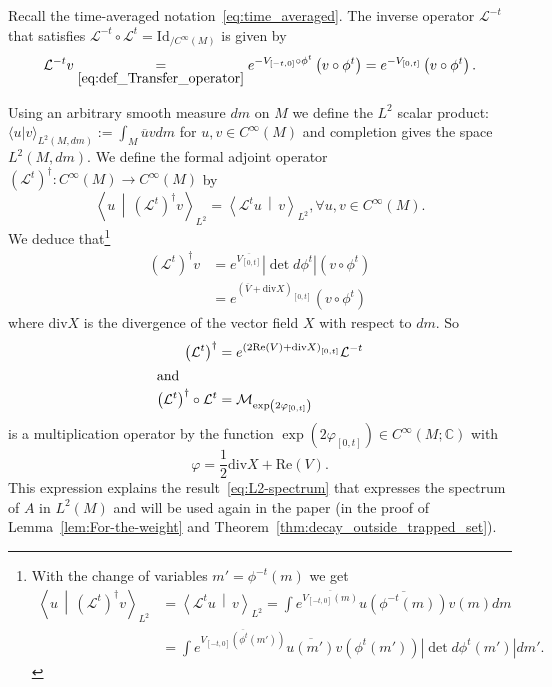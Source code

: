 \documentclass[10pt]{amsart}
\theoremstyle{definition}\newtheorem{defi}[theo]{Definition}\newtheorem{rema}[theo]{Remark}\newtheorem{exam}[theo]{Example}\newtheorem{exem}[theo]{Example}\newtheorem{nota}[theo]{Notation}
\newcommand{\clL}{\mathcal{L}}
\newcommand{\clM}{\mathcal{M}}
\newcommand{\Ree}{\mathrm{Re}}
\newcommand{\divv}{\mathrm{div}}
\newcommand{\Id}{\mathrm{Id}}
\newcommand{\bbC}{\mathbb{C}}
\let\oldforall\forall
\renewcommand*{\forall}{\mathrel{\oldforall}}
\begin{document}
Recall the time-averaged notation~\eqref{eq:time_averaged}. The inverse operator $\clL^{-t}$ that satisfies $\clL^{-t}\circ\clL^{t}=\Id _{/C^{\infty}(M)}$ is given by
\[
\clL^{-t}v\underset{\eqref{eq:def_Transfer_operator}}{=}e^{-V_{\left[-t,0\right]}\circ\phi^{t}}\left(v\circ\phi^{t}\right)=e^{-V_{\left[0,t\right]}}\left(v\circ\phi^{t}\right).
\]

Using an arbitrary smooth measure $dm$ on $M$ we define the $L^{2}$ scalar product: $\langle u|v\rangle_{L^{2}(M,dm)}:=\int_{M}\overline{u}vdm$ for $u,v\in C^{\infty}(M)$ and completion gives the space $L^{2}(M,dm)$. We define the formal adjoint operator $(\clL^{t})^{\dagger}:C^{\infty}(M)\rightarrow C^{\infty}(M)$ by
\[
\left\langle u\,\middle|\,\left(\clL^{t}\right)^{\dagger}v\right\rangle_{L^{2}}=\left\langle\clL^{t}u\,\middle|\,v\right\rangle_{L^{2}},\forall u,v\in C^{\infty}\left(M\right).
\]
We deduce that\footnote{With the change of variables $m'=\phi^{-t}(m)$ we get
\begin{align*}
\left\langle u\,\middle|\,\left(\clL^{t}\right)^{\dagger}v\right\rangle_{L^{2}} & =\left\langle\clL^{t}u\,\middle|\,v\right\rangle_{L^{2}}=\int e^{\overline{V_{\left[-t,0\right]}\left(m\right)}}\overline{u\left(\phi^{-t}\left(m\right)\right)}v\left(m\right)dm\\
& =\int e^{\overline{V_{\left[-t,0\right]}\left(\phi^{t}\left(m'\right)\right)}}\overline{u\left(m'\right)}v\left(\phi^{t}\left(m'\right)\right)\left|\det d\phi^{t}\left(m'\right)\right|dm'.
\end{align*}
}
\begin{align}
\left(\clL^{t}\right)^{\dagger}v & =e^{\overline{V_{\left[0,t\right]}}}\left|\det d\phi^{t}\right|\left(v\circ\phi^{t}\right)\label{eq:L2-adjoint_Lt}
\\
& =e^{\left(\overline{V}+\divv X\right)_{\left[0,t\right]}}\left(v\circ\phi^{t}\right)
\end{align}
where $\divv X$ is the divergence of the vector field $X$ with respect to $dm$. So
\begin{align}
\left(\clL^{t}\right)^{\dagger}&=e^{\left(2\Ree\left(V\right)+\divv X\right)_{\left[0,t\right]}}\clL^{-t}
\\
\intertext{and}
\left(\clL^{t}\right)^{\dagger}\circ\clL^{t}&=\clM_{\exp\left(2\varphi_{\left[0,t\right]}\right)}\label{eq:L*t*Lt}
\end{align}
is a multiplication operator by the function $\exp\left(2\varphi_{\left[0,t\right]}\right)\in C^{\infty}\left(M;\bbC\right)$ with
\begin{equation}\label{eq:def_At}
\varphi=\frac{1}{2}\divv X+\Ree\left(V\right).
\end{equation}
This expression explains the result~\eqref{eq:L2-spectrum} that expresses the spectrum of $A$ in $L^{2}(M)$ and will be used again in the paper (in the proof of Lemma~\ref{lem:For-the-weight} and Theorem~\ref{thm:decay_outside_trapped_set}).
\end{document}
